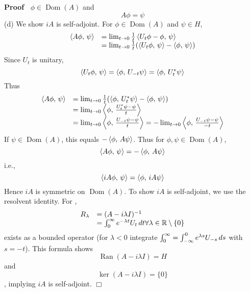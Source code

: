 \documentclass{article}
\newcommand{\tmop}[1]{\ensuremath{\operatorname{#1}}}
\newenvironment{proof}{\noindent\textbf{Proof\ }}{\hspace*{\fill}$\Box$\medskip}
\newcommand{\R}{\mathbb{R}}
\newcommand{\1}{\mathbbm{1}}
\newcommand{\ip}[2]{\left\langle #1, \hspace{0.17em} #2  \right\rangle}
\newcommand{\Dom}{\tmop{Dom}}
\newcommand{\Ran}{\tmop{Ran}}
\begin{document}
\begin{proof}
  $\phi \in \Dom (A)$ and
  \begin{equation}
    A \phi = \psi
  \end{equation}
  (d) We show $iA$ is self-adjoint. For $\phi \in \Dom (A)$ and $\psi \in H$,
  \begin{equation}
    \begin{array}{ll}
      \ip{A \phi}{\psi} & = \lim_{t \to 0}  \frac{1}{t} \ip{U_t \phi -
      \phi}{\psi}\\
      & = \lim_{t \to 0}  \frac{1}{t}  (\ip{U_t \phi}{\psi} -
      \ip{\phi}{\psi})
    \end{array}
  \end{equation}
  Since $U_t$ is unitary,
  \begin{equation}
    \ip{U_t \phi}{\psi} = \ip{\phi}{U_{- t} \psi} = \ip{\phi}{U_t^{\ast} \psi}
  \end{equation}
  Thus
  \begin{equation}
    \begin{array}{ll}
      \ip{A \phi}{\psi} & = \lim_{t \to 0}  \frac{1}{t}  (\ip{\phi}{U_t^{\ast}
      \psi} - \ip{\phi}{\psi})\\
      & = \lim_{t \to 0} \ip{\phi}{\frac{U_t^{\ast} \psi - \psi}{t}}\\
      & = \lim_{t \to 0} \ip{\phi}{\frac{U_{- t} \psi - \psi}{t}} = - \lim_{t
      \to 0} \ip{\phi}{\frac{U_{- t} \psi - \psi}{- t}}
    \end{array}
  \end{equation}
  If $\psi \in \Dom (A)$, this equals $- \ip{\phi}{A \psi}$. Thus for $\phi,
  \psi \in \Dom (A)$,
  \begin{equation}
    \ip{A \phi}{\psi} = - \ip{\phi}{A \psi}
  \end{equation}
  i.e.,
  \begin{equation}
    \ip{iA \phi}{\psi} = \ip{\phi}{iA \psi}
  \end{equation}
  Hence $iA$ is symmetric on $\Dom (A)$. To show $iA$ is self-adjoint, we use
  the resolvent identity. For ,
  \begin{equation}
    \begin{array}{ll}
      R_{\lambda} & = (A - i \lambda I)^{- 1}\\
      & = \int_0^{\infty} e^{- \lambda t} U_t  \hspace{0.17em} dt \forall
      \lambda \in \R \setminus \{0\}
    \end{array}
  \end{equation}
  exists as a bounded operator (for $\lambda < 0$ integrate $\int_0^{\infty} =
  \int_{- \infty}^0 e^{\lambda s} U_{- s}  \hspace{0.17em} ds$ with $s = -
  t$). This formula shows
  \begin{equation}
    \Ran (A - i \lambda I) = H
  \end{equation}
  and
  \begin{equation}
    \ker (A - i \lambda I) = \{0\}
  \end{equation}
  , implying $iA$ is self-adjoint.
\end{proof}
\end{document}
